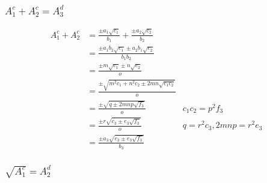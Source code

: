 \documentclass{article}
\begin{document}
\subsubsection{$A^c_1 + A^c_2 = A^d_3$}
\begin{align*}
 A^c_1 + A^c_2 &= \frac{\pm a_1\sqrt{c_1}}{b_1} + \frac{\pm a_2\sqrt{c_2}}{b_2} \\
 &= \frac{\pm a_1b_2\sqrt{c_1} \pm a_2b_1\sqrt{c_2}}{b_1b_2} \\
 &= \frac{\pm m\sqrt{c_1} \pm n\sqrt{c_2}}{o} \\
 &= \frac{\pm \sqrt{m^2c_1 + n^2c_2 \pm 2mn\sqrt{c_1c_2}}}{o} \\
 &= \frac{\pm \sqrt{q \pm 2mnp\sqrt{f_3}}}{o}     & c_1c_2 = p^2f_3\\
 &= \frac{\pm r\sqrt{c_3 \pm e_3\sqrt{f_3}}}{o}   & q = r^2c_3, 2mnp = r^2e_3 \\
 &= \frac{\pm a_3\sqrt{c_3 \pm e_3\sqrt{f_3}}}{b_3}
\end{align*}

\subsubsection{$\sqrt{A_1^c} = A_2^d$}
\end{document}
